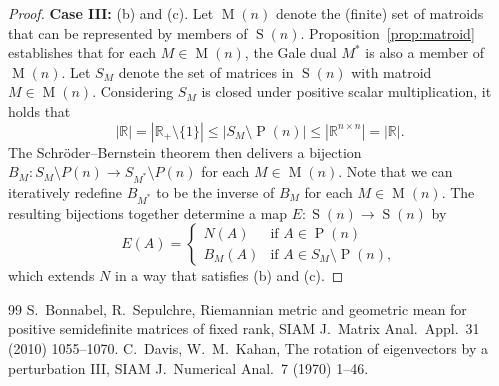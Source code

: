 \documentclass[10pt,a4paper]{amsart}
\newcommand{\oM}{\operatorname{M}}
\newcommand{\oP}{\operatorname{P}}
\newcommand{\oS}{\operatorname{S}}
\begin{document}
\begin{proof}
\medskip
\noindent
\textbf{Case III:} (b) and (c).
Let $\oM(n)$ denote the (finite) set of matroids that can be represented by members of $\oS(n)$.
Proposition~\ref{prop:matroid} establishes that for each $M\in\oM(n)$, the Gale dual $M^*$ is also a member of $\oM(n)$. 
Let $S_M$ denote the set of matrices in $\oS(n)$ with matroid $M\in\oM(n)$.
Considering $S_M$ is closed under positive scalar multiplication, it holds that
\[
|\mathbb{R}|
=|\mathbb{R}_+\setminus\{1\}|
\leq|S_M\setminus\oP(n)|
\leq|\mathbb{R}^{n\times n}|
=|\mathbb{R}|.
\]
The Schr\"{o}der--Bernstein theorem then delivers a bijection $B_M\colon S_M\setminus{P}(n)\to S_{M^*}\setminus{P}(n)$ for each $M\in\oM(n)$.
Note that we can iteratively redefine $B_{M^*}$ to be the inverse of $B_M$ for each $M\in\oM(n)$.
The resulting bijections together determine a map $E\colon\oS(n)\to\oS(n)$ by
\[
E(A)
=\left\{\begin{array}{rl} N(A)&\text{if }A\in\oP(n)\\
B_M(A)&\text{if }A\in S_M\setminus\oP(n),
\end{array}\right.
\]
which extends $N$ in a way that satisfies (b) and (c).
\end{proof}

\begin{thebibliography}{99}
 S.\ Bonnabel, R.\ Sepulchre, Riemannian metric and geometric mean for positive semidefinite matrices of fixed rank, SIAM J.\ Matrix Anal.\ Appl.\ 31 (2010) 1055--1070.
 C.\ Davis, W.\ M.\ Kahan, The rotation of eigenvectors by a perturbation III, SIAM J.\ Numerical Anal.\ 7 (1970) 1--46.
\end{thebibliography}
\end{document}
